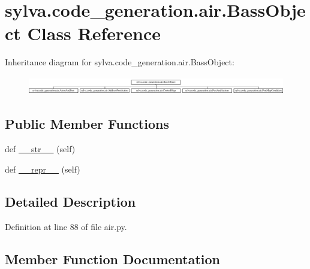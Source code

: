 \hypertarget{classsylva_1_1code__generation_1_1air_1_1_bass_object}{}\section{sylva.\+code\+\_\+generation.\+air.\+Bass\+Object Class Reference}
\label{classsylva_1_1code__generation_1_1air_1_1_bass_object}
Inheritance diagram for sylva.\+code\+\_\+generation.\+air.\+Bass\+Object\+:\begin{figure}[H]
\begin{center}
\leavevmode
\includegraphics[height=0.805755cm]{classsylva_1_1code__generation_1_1air_1_1_bass_object}
\end{center}
\end{figure}
\subsection*{Public Member Functions}
\begin{DoxyCompactItemize}
\item 
def \hyperlink{classsylva_1_1code__generation_1_1air_1_1_bass_object_a2c164720220479369c29db97b67aabe8}{\+\_\+\+\_\+str\+\_\+\+\_\+} (self)
\item 
def \hyperlink{classsylva_1_1code__generation_1_1air_1_1_bass_object_a17548b84b2a55240a429506aed418292}{\+\_\+\+\_\+repr\+\_\+\+\_\+} (self)
\end{DoxyCompactItemize}


\subsection{Detailed Description}


Definition at line 88 of file air.\+py.



\subsection{Member Function Documentation}
\mbox{\label{classsylva_1_1code__generation_1_1air_1_1_bass_object_a17548b84b2a55240a429506aed418292}} 
